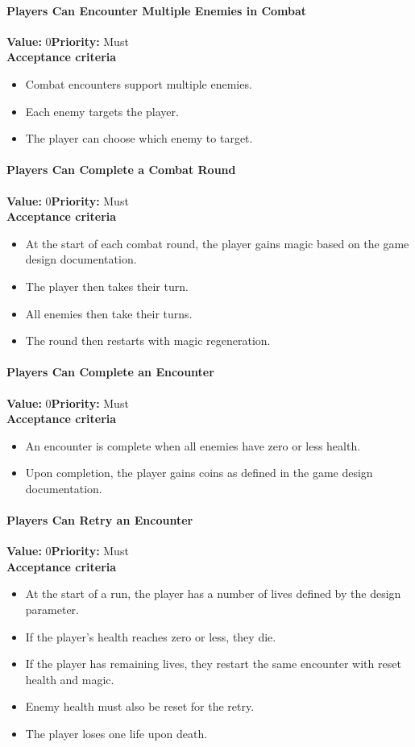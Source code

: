 \paragraph{Players Can Encounter Multiple Enemies in Combat}
\textbf{Value:} 0\quad \textbf{Priority:} Must\\
\textbf{Acceptance criteria}
\begin{itemize}
  \item Combat encounters support multiple enemies.
  \item Each enemy targets the player.
  \item The player can choose which enemy to target.
\end{itemize}

\paragraph{Players Can Complete a Combat Round}
\textbf{Value:} 0\quad \textbf{Priority:} Must\\
\textbf{Acceptance criteria}
\begin{itemize}
  \item At the start of each combat round, the player gains magic based on the game design documentation.
  \item The player then takes their turn.
  \item All enemies then take their turns.
  \item The round then restarts with magic regeneration.
\end{itemize}

\paragraph{Players Can Complete an Encounter}
\textbf{Value:} 0\quad \textbf{Priority:} Must\\
\textbf{Acceptance criteria}
\begin{itemize}
  \item An encounter is complete when all enemies have zero or less health.
  \item Upon completion, the player gains coins as defined in the game design documentation.
\end{itemize}

\paragraph{Players Can Retry an Encounter}
\textbf{Value:} 0\quad \textbf{Priority:} Must\\
\textbf{Acceptance criteria}
\begin{itemize}
  \item At the start of a run, the player has a number of lives defined by the design parameter.
  \item If the player's health reaches zero or less, they die.
  \item If the player has remaining lives, they restart the same encounter with reset health and magic.
  \item Enemy health must also be reset for the retry.
  \item The player loses one life upon death.
\end{itemize}

